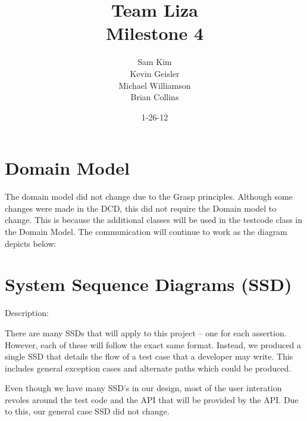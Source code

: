 \documentclass{article}
\title{Team Liza \\ Milestone 4}
\author{Sam Kim \\ Kevin Geisler \\ Michael Williamson \\ Brian Collins}
\date{1-26-12}
\begin{document}
\maketitle
\newpage

\tableofcontents

\newpage

\section{Domain Model}

The domain model did not change due to the Grasp principles.  Although some 
changes were made in the DCD, this did not require the Domain model to change.
This is because the additional classes will be used in the testcode class in the 
Domain Model.  The communication will continue to work as the diagram depicts below:





\section{System Sequence Diagrams (SSD)}

Description:  \newline

There are many SSDs that will apply to this project -- one for each assertion. 
However, each of these will follow the exact same format. Instead, we
produced a single SSD that details the flow of a test case that a developer may
write.  This includes general exception cases and alternate paths which could be
produced.  \newline 



Even though we have many SSD's in our design, most of the user interation revoles 
around the test code and the API that will be provided by the API.  Due to this, our 
general case SSD did not change.
\end{document}
